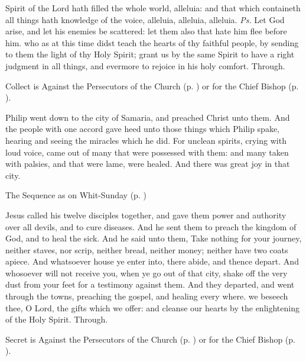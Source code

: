 \introit
{} Spirit of the Lord hath filled the whole world, alleluia: and that which containeth all things hath knowledge of the voice, alleluia, alleluia, alleluia. \textit{Ps.} Let God arise, and let his enemies be scattered: let them also that hate him flee before him.
\collect
{} who as at this time didst teach the hearts of thy faithful people, by sending to them the light of thy Holy Spirit; grant us by the same Spirit to have a right judgment in all things, and evermore to rejoice in his holy comfort. Through.
\begin{rubric}
     Collect is Against the Persecutors of the Church (p. \pageref{SPAgainst}) or for the Chief Bishop (p. \pageref{SPChiefBishop}).
\end{rubric}
 Philip went down to the city of Samaria, and preached Christ unto them. And the people with one accord gave heed unto those things which Philip spake, hearing and seeing the miracles which he did. For unclean spirits, crying with loud voice, came out of many that were possessed with them: and many taken with palsies, and that were lame, were healed. And there was great joy in that city.
\begin{rubric}
{The Sequence as on Whit-Sunday (p. \pageref{WhitSeq})}
\end{rubric}
 Jesus called his twelve disciples together, and gave them power and authority over all devils, and to cure diseases. And he sent them to preach the kingdom of God, and to heal the sick. And he said unto them, Take nothing for your journey, neither staves, nor scrip, neither bread, neither money; neither have two coats apiece. And whatsoever house ye enter into, there abide, and thence depart. And whosoever will not receive you, when ye go out of that city, shake off the very dust from your feet for a testimony against them. And they departed, and went through the towns, preaching the gospel, and healing every where.
\secret
{} we beseech thee, O Lord, the gifts which we offer: and cleanse our hearts by the enlightening of the Holy Spirit. Through.
\begin{rubric}
     Secret is Against the Persecutors of the Church (p. \pageref{SPAgainst}) or for the Chief Bishop (p. \pageref{SPChiefBishop}).
\end{rubric}


